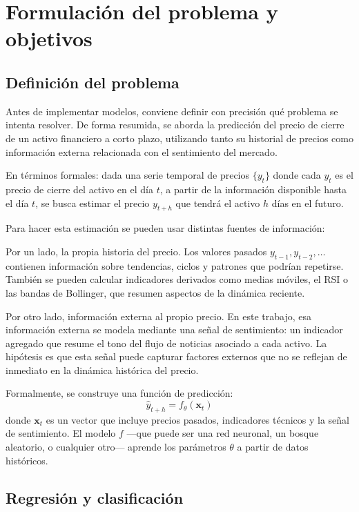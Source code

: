 \chapter{Formulación del problema y objetivos}
\label{ch:objetivos}

\section{Definición del problema}

Antes de implementar modelos, conviene definir con precisión qué problema se intenta resolver. De forma resumida, se aborda la predicción del precio de cierre de un activo financiero a corto plazo, utilizando tanto su historial de precios como información externa relacionada con el sentimiento del mercado.

En términos formales: dada una serie temporal de precios $\{y_t\}$ donde cada $y_t$ es el precio de cierre del activo en el día $t$, a partir de la información disponible hasta el día $t$, se busca estimar el precio $y_{t+h}$ que tendrá el activo $h$ días en el futuro.

Para hacer esta estimación se pueden usar distintas fuentes de información:

Por un lado, la propia historia del precio. Los valores pasados $y_{t-1}, y_{t-2}, \ldots$ contienen información sobre tendencias, ciclos y patrones que podrían repetirse. También se pueden calcular indicadores derivados como medias móviles, el RSI o las bandas de Bollinger, que resumen aspectos de la dinámica reciente.

Por otro lado, información externa al propio precio. En este trabajo, esa información externa se modela mediante una señal de sentimiento: un indicador agregado que resume el tono del flujo de noticias asociado a cada activo. La hipótesis es que esta señal puede capturar factores externos que no se reflejan de inmediato en la dinámica histórica del precio.

Formalmente, se construye una función de predicción:
\[
\hat{y}_{t+h} = f_{\theta}(\mathbf{x}_t)
\]
donde $\mathbf{x}_t$ es un vector que incluye precios pasados, indicadores técnicos y la señal de sentimiento. El modelo $f$ ---que puede ser una red neuronal, un bosque aleatorio, o cualquier otro--- aprende los parámetros $\theta$ a partir de datos históricos.

\section{Regresión y clasificación}

